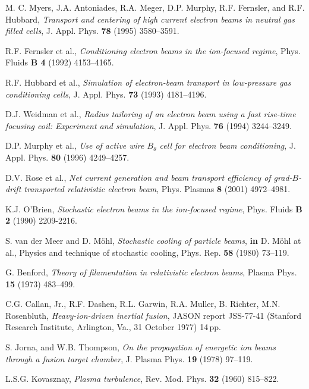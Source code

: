 \documentclass [12pt,a4paper,     ]{report} %
\begin{document}
\begin{enumerate}
 M. C. Myers, J.A. Antoniades, R.A. Meger, D.P. Murphy, R.F. Fernsler, and R.F. Hubbard, \emph{Transport and centering of high current electron beams in neutral gas filled cells}, J. Appl. Phys. {\bf 78} (1995) 3580--3591.

 R.F. Fernsler et al., \emph{Conditioning electron beams in the ion-focused regime}, Phys. Fluids {\bf B 4} (1992) 4153--4165.

  R.F. Hubbard et al., \emph{Simulation of electron-beam transport in low-pressure gas conditioning cells}, J. Appl. Phys. {\bf 73} (1993) 4181--4196.

 D.J. Weidman et al., \emph{Radius tailoring of an electron beam using a fast rise-time focusing coil: Experiment and simulation},  J. Appl. Phys. {\bf 76} (1994) 3244--3249.

 D.P. Murphy et al., \emph{Use of active wire $B_{\theta}$ cell for electron beam conditioning}, J. Appl. Phys. {\bf 80} (1996) 4249--4257.

 D.V. Rose et al., \emph{Net current generation and beam transport efficiency of grad-$B$-drift transported relativistic electron beam}, Phys. Plasmas {\bf 8} (2001) 4972--4981.

 K.J. O'Brien, \emph{Stochastic electron beams in the ion-focused regime}, Phys. Fluids {\bf B 2} (1990) 2209-2216.

 S. van der Meer and D. M\"ohl, \emph{Stochastic cooling of particle beams}, {\bf in} D. M\"ohl at al., Physics and technique of stochastic cooling, Phys. Rep. {\bf 58} (1980) 73--119.



 G. Benford, \emph{Theory of filamentation in relativistic electron beams}, Plasma Phys. {\bf 15} (1973) 483--499.

 C.G. Callan, Jr., R.F. Dashen, R.L. Garwin, R.A. Muller, B. Richter, M.N. Rosenbluth, \emph{Heavy-ion-driven inertial fusion}, JASON report JSS-77-41 (Stanford Research Institute, Arlington, Va., 31 October 1977) 14\,pp.

 S. Jorna, and W.B. Thompson, \emph{On the propagation of energetic ion beams through a fusion target chamber}, J. Plasma Phys. {\bf 19} (1978) 97--119.

 L.S.G. Kovasznay, \emph{Plasma turbulence}, Rev. Mod. Phys. {\bf 32} (1960) 815--822.


\end{enumerate}
\end{document}
